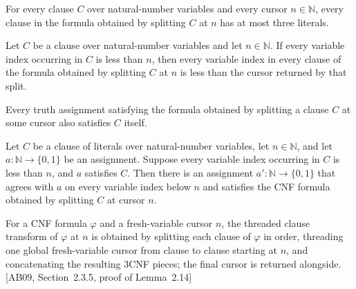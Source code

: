 \begin{lemma}
\label{Complexity.satSplitClause_width}
\leanok
{}
For every clause $C$ over natural-number variables and every cursor $n\in\mathbb{N}$,
every clause in the formula obtained by splitting $C$ at $n$ has at most three literals.
\end{lemma}

\begin{lemma}
\label{Complexity.satSplitClause_vars}
\leanok
{}
Let $C$ be a clause over natural-number variables and let $n\in\mathbb{N}$. If every
variable index occurring in $C$ is less than $n$, then every variable index in every
clause of the formula obtained by splitting $C$ at $n$ is less than the cursor returned
by that split.
\end{lemma}

\begin{lemma}
\label{Complexity.satSplitClause_sound}
\leanok
{}
Every truth assignment satisfying the formula obtained by splitting a clause $C$ at
some cursor also satisfies $C$ itself.
\end{lemma}

\begin{lemma}
\label{Complexity.satSplitClause_complete}
\leanok
{}
Let $C$ be a clause of literals over natural-number variables, let $n\in\mathbb{N}$, and
let $a:\mathbb{N}\to\{0,1\}$ be an assignment. Suppose every variable index occurring in
$C$ is less than $n$, and $a$ satisfies $C$. Then there is an assignment
$a':\mathbb{N}\to\{0,1\}$ that agrees with $a$ on every variable index below $n$ and
satisfies the CNF formula obtained by splitting $C$ at cursor $n$.
\end{lemma}

\begin{definition}
\label{Complexity.satTransformFrom}
\leanok
{}
For a CNF formula $\varphi$ and a fresh-variable cursor $n$, the threaded clause
transform of $\varphi$ at $n$ is obtained by splitting each clause of $\varphi$ in
order, threading one global fresh-variable cursor from clause to clause starting
at $n$, and concatenating the resulting 3CNF pieces; the final cursor is returned
alongside. [AB09, Section~2.3.5, proof of Lemma~2.14]
\end{definition}

